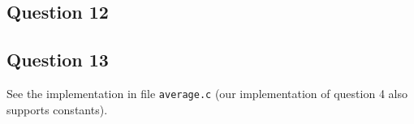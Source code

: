 
\subsection*{Question 12}


\subsection*{Question 13}

See the implementation in file \texttt{average.c} (our implementation of question 4 also supports constants).



